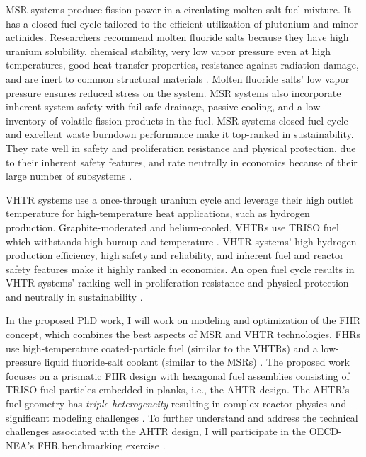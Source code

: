 \gls{MSR} systems produce fission power in a circulating molten salt fuel mixture. 
It has a closed fuel cycle tailored to the efficient utilization of plutonium 
and minor actinides. 
Researchers recommend molten fluoride salts because they have high uranium solubility, 
chemical stability, very low vapor pressure even at high temperatures, good heat 
transfer properties, resistance against radiation damage, and are inert to common
structural materials \cite{rosenthal_molten-salt_1970}.  
Molten fluoride salts' low vapor pressure ensures reduced stress on the system. 
MSR systems also incorporate inherent system safety with fail-safe drainage, 
passive cooling, and a low inventory of volatile fission products in the fuel. 
\gls{MSR} systems closed fuel cycle and excellent waste burndown performance 
make it top-ranked in sustainability. 
They rate well in safety and proliferation resistance and physical protection, 
due to their inherent safety features, and rate neutrally in economics because of
their large number of subsystems \cite{gif_technology_2002}.  

\gls{VHTR} systems use a once-through uranium cycle and leverage their 
high outlet temperature for high-temperature heat applications, such as hydrogen 
production. 
Graphite-moderated and helium-cooled, \glspl{VHTR} use \gls{TRISO} fuel
which withstands high burnup and temperature \cite{gif_technology_2002}.  
\gls{VHTR} systems' high hydrogen production efficiency, high safety and 
reliability, and inherent fuel and reactor safety features make it highly 
ranked in economics. 
An open fuel cycle results in \gls{VHTR} systems' ranking well in proliferation 
resistance and physical protection and neutrally in sustainability 
\cite{gif_technology_2002}. 

In the proposed PhD work, I will work on modeling and optimization of the 
\gls{FHR} concept, which combines the best aspects of \gls{MSR} and \gls{VHTR} 
technologies. 
\glspl{FHR} use high-temperature coated-particle fuel (similar to the \glspl{VHTR}) 
and a low-pressure liquid fluoride-salt coolant (similar to the \glspl{MSR})
\cite{forsberg_fluoride-salt-cooled_2012,facilitators_fluoride-salt-cooled_2013}.
The proposed work focuses on a prismatic \gls{FHR} design with hexagonal fuel 
assemblies consisting of \gls{TRISO} fuel particles embedded in planks, i.e., 
the \gls{AHTR} design.
The \gls{AHTR}'s fuel geometry has \emph{triple heterogeneity} resulting in 
complex reactor physics and significant modeling challenges 
\cite{petrovic_benchmark_2021}. 
To further understand and address the technical challenges associated with the 
\gls{AHTR} design, I will participate in the \gls{OECD}-\gls{NEA}'s \gls{FHR} 
benchmarking exercise \cite{petrovic_benchmark_2021}.

